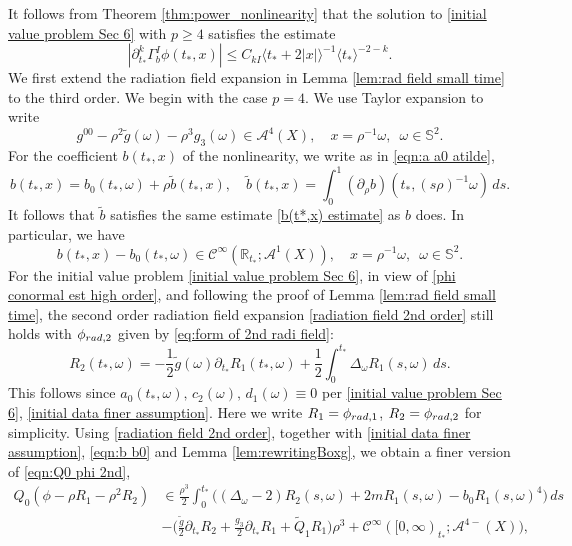 \documentclass[10pt,a4paper,reqno]{amsart}
\newcommand{\CI}{\mathcal{C}^\infty}
\newcommand{\RR}{\mathbb{R}}
\newcommand{\A}{\mathcal{A}}
\newcommand{\pa}{\partial}
\newcommand{\ti}{\tilde}
\newcommand{\la}{\langle}
\newcommand{\ra}{\rangle}
\theoremstyle{definition}
\theoremstyle{remark}
\numberwithin{equation}{section}
\newcommand{\ts}{t_*}
\begin{document}
\medskip
\noindent
It follows from Theorem \ref{thm:power_nonlinearity} that the solution to \eqref{initial value problem Sec 6} with $p\geq 4$ satisfies the estimate
\begin{equation}
\label{phi conormal est high order}
	|\pa_{\ts}^k \Gamma_b^I \phi(\ts,x)| \leq C_{k I} \la\ts + 2 |x|\ra^{-1} \la \ts \ra^{-2-k}.
\end{equation}
We first extend the radiation field expansion in Lemma \ref{lem:rad field small time} to the third order. We begin with the case $p=4$. We use Taylor expansion to write
\begin{equation}
\label{eqn:g00 Sec 6}
    g^{00} - \rho^2 \ti g(\omega) - \rho^3 g_3(\omega) \in \A^4(X),\quad x=\rho^{-1}\omega,\ \;\omega\in\mathbb{S}^2.
\end{equation}
For the coefficient $b(\ts,x)$ of the nonlinearity, we write as in \eqref{eqn:a a0 atilde},
\begin{equation}
\label{eqn:b b0 btilde}
    b(\ts,x) = b_0(\ts,\omega) + \rho\tilde{b}(\ts,x),\quad \tilde{b}(\ts,x) = \int_0^1 (\pa_\rho b) (\ts,(s\rho)^{-1}\omega)\,ds.
\end{equation}
It follows that $\tilde{b}$ satisfies the same estimate \eqref{b(t*,x) estimate} as $b$ does. In particular, we have
\begin{equation}
\label{eqn:b b0}
    b(\ts,x) - b_0(\ts,\omega) \in \CI(\RR_{\ts};\A^1(X)),\quad x=\rho^{-1}\omega,\ \;\omega\in\mathbb{S}^2 .
\end{equation}
For the initial value problem \eqref{initial value problem Sec 6}, in view of \eqref{phi conormal est high order}, and following the proof of Lemma \ref{lem:rad field small time}, the second order radiation field expansion \eqref{radiation field 2nd order} still holds with $\phi_{\rm{rad},2}$ given by \eqref{eq:form of 2nd radi field}:
\begin{equation}
\label{eq:R2 Sec 6}
    R_2(\ts,\omega) = -\frac{1}{2}\tilde{g}(\omega)\partial_{\ts} R_1(\ts,\omega) + \frac{1}{2}\int_0^{\ts} \Delta_\omega R_1(s,\omega)\,ds.
\end{equation}
This follows since $a_0(\ts,\omega), \,c_2(\omega),\, d_1(\omega)\equiv 0$ per \eqref{initial value problem Sec 6}, \eqref{initial data finer assumption}.
Here we write $R_1 = \phi_{\rm{rad},1}$, $R_2 = \phi_{\rm{rad},2}$ for simplicity. Using \eqref{radiation field 2nd order}, together with \eqref{initial data finer assumption}, \eqref{eqn:b b0} and Lemma \ref{lem:rewritingBoxg}, we obtain a finer version of \eqref{eqn:Q0 phi 2nd}, 
\begin{equation}
\label{eqn:Q0 phi 3rd order}
\begin{split}
    Q_0(\phi - \rho R_1 - \rho^2 R_2) &\in
    \frac{\rho^3}{2}\int_0^{\ts} \bigr((\Delta_\omega-2)R_2(s,\omega) + 2m R_1(s,\omega) - b_0 R_1(s,\omega)^4 \bigr)\,ds \\
    & -\bigl(\frac{\tilde{g}}{2}\pa_{\ts} R_2 + \frac{g_3}{2} \pa_{\ts}R_1 + \widetilde{Q}_1 R_1 \bigr)\rho^3 + \CI([0,\infty)_{\ts};\A^{4-}(X)),
\end{split}
\end{equation}
\end{document}
